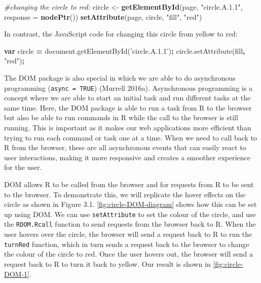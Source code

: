 \documentclass[11pt,]{report}
\newenvironment{Shaded}{\begin{snugshade}}{\end{snugshade}}
\newcommand{\KeywordTok}[1]{\textcolor[rgb]{0.13,0.29,0.53}{\textbf{#1}}}
\newcommand{\DataTypeTok}[1]{\textcolor[rgb]{0.13,0.29,0.53}{#1}}
\newcommand{\StringTok}[1]{\textcolor[rgb]{0.31,0.60,0.02}{#1}}
\newcommand{\CommentTok}[1]{\textcolor[rgb]{0.56,0.35,0.01}{\textit{#1}}}
\newcommand{\VariableTok}[1]{\textcolor[rgb]{0.00,0.00,0.00}{#1}}
\newcommand{\OperatorTok}[1]{\textcolor[rgb]{0.81,0.36,0.00}{\textbf{#1}}}
\newcommand{\AttributeTok}[1]{\textcolor[rgb]{0.77,0.63,0.00}{#1}}
\newcommand{\NormalTok}[1]{#1}
\begin{document}
\begin{Shaded}
\begin{Highlighting}[]
\CommentTok{#changing the circle to red:}
\NormalTok{circle <-}\StringTok{ }\KeywordTok{getElementById}\NormalTok{(page, }\StringTok{"circle.A.1.1"}\NormalTok{, }\DataTypeTok{response =} \KeywordTok{nodePtr}\NormalTok{())}
\KeywordTok{setAttribute}\NormalTok{(page, circle, }\StringTok{"fill"}\NormalTok{, }\StringTok{"red"}\NormalTok{)}
\end{Highlighting}
\end{Shaded}

In contrast, the JavaScript code for changing this circle from yellow to
red:

\begin{Shaded}
\begin{Highlighting}[]
\KeywordTok{var}\NormalTok{ circle }\OperatorTok{=} \VariableTok{document}\NormalTok{.}\AttributeTok{getElementById}\NormalTok{(}\StringTok{'circle.A.1.1'}\NormalTok{)}\OperatorTok{;}
\VariableTok{circle}\NormalTok{.}\AttributeTok{setAttribute}\NormalTok{(fill}\OperatorTok{,} \StringTok{"red"}\NormalTok{)}\OperatorTok{;}
\end{Highlighting}
\end{Shaded}

The \textsf{DOM} package is also special in which we are able to do
asynchronous programming (\texttt{async\ =\ TRUE}) (Murrell 2016a).
Asynchronous programming is a concept where we are able to start an
initial task and run different tasks at the same time. Here, the
\textsf{DOM} package is able to run a task from R to the browser but
also be able to run commands in R while the call to the browser is still
running. This is important as it makes our web applications more
efficient than trying to run each command or task one at a time. When we
need to call back to R from the browser, these are all asynchronous
events that can easily react to user interactions, making it more
responsive and creates a smoother experience for the user.

\textsf{DOM} allows R to be called from the browser and for requests
from R to be sent to the browser. To demonstrate this, we will replicate
the hover effects on the circle as shown in Figure 3.1.
\autoref{fig:circle-DOM-diagram} shows how this can be set up using
\textsf{DOM}. We can use \texttt{setAttribute} to set the colour of the
circle, and use the \texttt{RDOM.Rcall} function to send requests from
the browser back to R. When the user hovers over the circle, the browser
will send a request back to R to run the \texttt{turnRed} function,
which in turn sends a request back to the browser to change the colour
of the circle to red. Once the user hovers out, the browser will send a
request back to R to turn it back to yellow. Our result is shown in
\autoref{fig:circle-DOM-1}.
\end{document}
